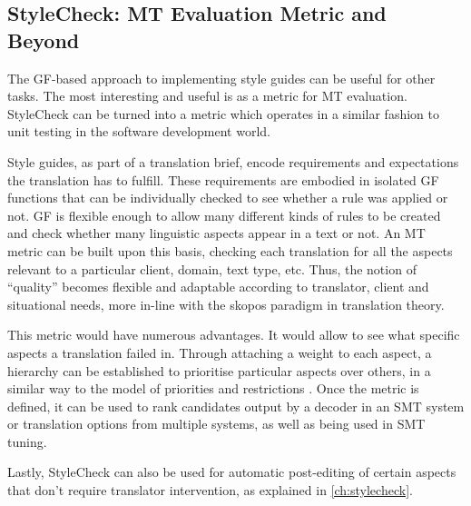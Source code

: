 \subsection{StyleCheck: MT Evaluation Metric and Beyond}

\noindent The \ac{GF}-based approach to implementing style guides can be useful for other tasks. The most interesting and useful is as a metric for \ac{MT} evaluation. StyleCheck can be turned into a metric which operates in a similar fashion to unit testing in the software development world.

Style guides, as part of a translation brief, encode requirements and expectations the translation has to fulfill. These requirements are embodied in isolated \ac{GF} functions that can be individually checked to see whether a rule was applied or not. \ac{GF} is flexible enough to allow many different kinds of rules to be created and check whether many linguistic aspects appear in a text or not. An \ac{MT} metric can be built upon this basis, checking each translation for all the aspects relevant to a particular client, domain, text type, etc. Thus, the notion of ``quality'' becomes flexible and adaptable according to translator, client and situational needs, more in-line with the skopos paradigm in translation theory.

This metric would have numerous advantages. It would allow to see what specific aspects a translation failed in. Through attaching a weight to each aspect, a hierarchy can be established to prioritise particular aspects over others, in a similar way to the model of priorities and restrictions \parencite{zabalbeascoa1999priorities}. Once the metric is defined, it can be used to rank candidates output by a decoder in an \ac{SMT} system or translation options from multiple systems, as well as being used in \ac{SMT} tuning.

Lastly, StyleCheck can also be used for automatic post-editing of certain aspects that don't require translator intervention, as explained in \autoref{ch:stylecheck}.
